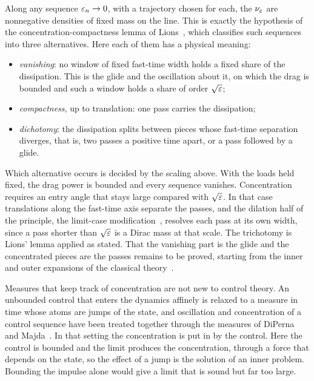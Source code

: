 \documentclass[english,11pt]{extarticle}
\begin{document}
Along any sequence $\varepsilon_n\to 0$, with a trajectory chosen for each, the
$\nu_\varepsilon$ are nonnegative densities of fixed mass on the line. This is
exactly the hypothesis of the concentration-compactness lemma of
Lions~\cite[Lemma~I.1]{lions1984concentration1}, which classifies such
sequences into three alternatives. Here each of them has a physical meaning:
\begin{itemize}[itemsep=1pt]
  \item \emph{vanishing}: no window of fixed fast-time width holds a fixed
    share of the dissipation. This is the glide and the oscillation about
    it, on which the drag is bounded and such a window holds a share of
    order $\sqrt{\varepsilon}$;
  \item \emph{compactness}, up to translation: one pass carries the
    dissipation;
  \item \emph{dichotomy}: the dissipation splits between pieces whose
    fast-time separation diverges, that is, two passes a positive time
    apart, or a pass followed by a glide.
\end{itemize}
Which alternative occurs is decided by the scaling above. With the loads
held fixed, the drag power is bounded and every sequence vanishes.
Concentration requires an entry angle that stays large compared with
$\sqrt{\varepsilon}$. In that case translations along the fast-time axis separate
the passes, and the dilation half of the principle, the limit-case
modification~\cite{lions1985limit1}, resolves each pass at its own width,
since a pass shorter than $\sqrt{\varepsilon}$ is a Dirac mass at that scale. The
trichotomy is Lions' lemma applied as stated. That the vanishing part is the
glide and the concentrated pieces are the passes remains to be proved,
starting from the inner and outer expansions of the classical
theory~\cite{shi1971skip}.

Measures that keep track of concentration are not new to control theory. An
unbounded control that enters the dynamics affinely is relaxed to a measure
in time whose atoms are jumps of the state, and oscillation and
concentration of a control sequence have been treated together through the
measures of DiPerna and
Majda~\cite[and the references there]{claeys2017semidefinite}. In that
setting the concentration is put in by the control. Here the control is
bounded and the limit produces the concentration, through a force that
depends on the state, so the effect of a jump is the solution of an inner
problem. Bounding the impulse alone would give a limit that is sound but far
too large.
\end{document}
